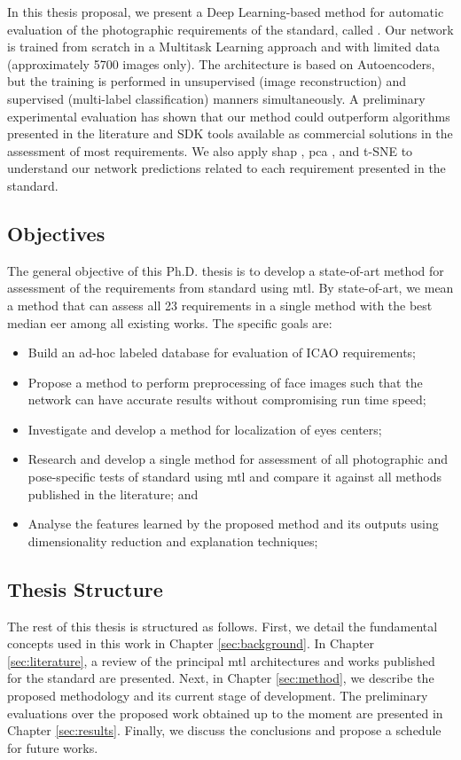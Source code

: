 In this thesis proposal, we present a Deep Learning-based method for automatic evaluation of the photographic requirements of the \icao standard, called \methodname. Our network is trained from scratch in a Multitask Learning approach and with limited data (approximately 5700 images only). The architecture is based on Autoencoders, but the training is performed in unsupervised (image reconstruction) and supervised (multi-label classification) manners simultaneously. A preliminary experimental evaluation has shown that our method could outperform algorithms presented in the literature and SDK tools available as commercial solutions in the assessment of most requirements. We also apply \acf{shap} \citep{shap2018}, \acf{pca} \citep{pca}, and t-SNE \citep{tsne} to understand our network predictions related to each requirement presented in the \icao standard.

\subsection{Objectives}	

The general objective of this Ph.D. thesis is to develop a state-of-art method for assessment of the requirements from \icao standard using \acl{mtl}. By state-of-art, we mean a method that can assess all 23 requirements in a single method with the best median \acs{eer} among all existing works. The specific goals are:

\begin{itemize}
\item Build an ad-hoc labeled database for evaluation of ICAO requirements;
\item Propose a method to perform preprocessing of face images such that the network can have accurate results without compromising run time speed;
\item Investigate and develop a method for localization of eyes centers;
\item Research and develop a single method for assessment of all photographic and pose-specific tests of \icao standard using \acf{mtl} and compare it against all methods published in the literature; and
\item Analyse the features learned by the proposed method and its outputs using dimensionality reduction and explanation techniques;
\end{itemize}

\subsection{Thesis Structure}

The rest of this thesis is structured as follows. First, we detail the fundamental concepts used in this work in Chapter \ref{sec:background}. In Chapter \ref{sec:literature}, a review of the principal \acl{mtl} architectures and works published for the \icao standard are presented. Next, in Chapter \ref{sec:method}, we describe the proposed methodology and its current stage of development. The preliminary evaluations over the proposed work obtained up to the moment are presented in Chapter \ref{sec:results}. Finally, we discuss the conclusions and propose a schedule for future works.
